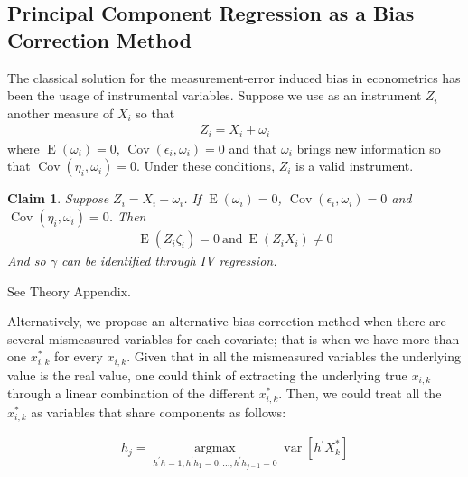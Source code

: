 \documentclass[10pt]{article}
\makeatletter
\newtheorem{claim}{Claim}
\renewenvironment{proof}[1][\proofname] {\par\pushQED{\qed}\normalfont\topsep6\p@\@plus6\p@\relax\trivlist\item[\hskip\labelsep\bfseries#1\@addpunct{.}]\ignorespaces}{\popQED\endtrivlist\@endpefalse}
\makeatother
\begin{document}
    \subsection*{Principal Component Regression as a Bias Correction Method}
        
        The classical solution for the measurement-error induced bias in econometrics has been the usage of instrumental variables. Suppose we use as an instrument $Z_i$ another measure of $X_i$ so that
        \begin{align}
            Z_i=X_i+\omega_i
        \end{align}
        where $\operatorname{E}(\omega_i)=0$, $\operatorname{Cov}(\epsilon_i,\omega_i)=0$ and that $\omega_i$ brings new information so that $\operatorname{Cov}(\eta_i,\omega_i)=0$.  Under these conditions, $Z_i$ is a valid instrument.

        \begin{claim}
        Suppose $ Z_i=X_i+\omega_i$. If $\operatorname{E}(\omega_i)=0$, $\operatorname{Cov}(\epsilon_i,\omega_i)=0$ and $\operatorname{Cov}(\eta_i,\omega_i)=0$. Then
        \begin{align}
        \operatorname{E}(Z_i\zeta_i)=0 \ \text{and} \  \operatorname{E}(Z_iX_i)\neq0
        \end{align}
        And so $\gamma$ can be identified through IV regression.
        \end{claim}

        \begin{proof}
        See Theory Appendix.
        \end{proof}
        
        Alternatively, we propose an alternative bias-correction method when there are several mismeasured variables for each covariate; that is when we have more than one $x_{i,k}^*$ for every $x_{i,k}$. Given that in all the mismeasured variables the underlying value is the real value, one could think of extracting the underlying true $x_{i,k}$ through a linear combination of the different $x_{i,k}^*$. Then, we could treat all the $x_{i,k}^*$ as variables that share components as follows:

        \begin{align} \label{variance_max}
           h_{j}=\underset{h^{\prime} h=1, h^{\prime} h_{1}=0, \ldots, h^{\prime} h_{j-1}=0}{\operatorname{argmax}} \operatorname{var}\left[h^{\prime} X^*_k\right]  
        \end{align}
        
\end{document}
